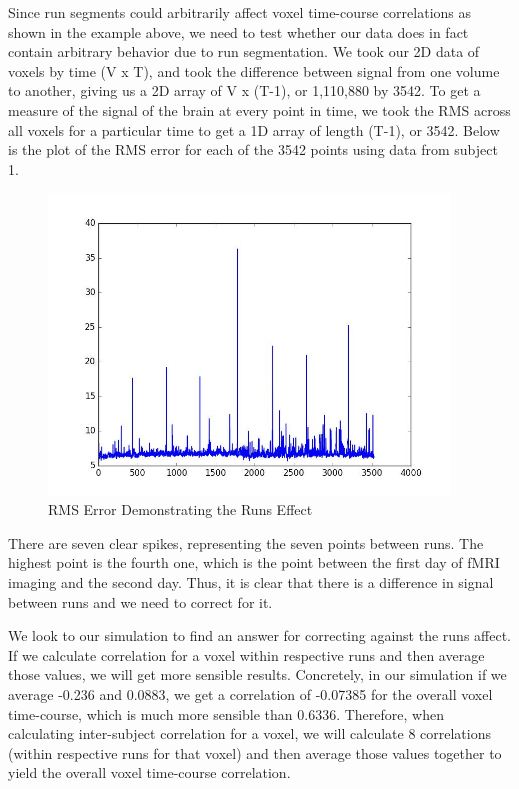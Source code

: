 \documentclass[11pt]{article}
\begin{document}
Since run segments could arbitrarily affect voxel time-course correlations as shown in the example above, we need to test whether our data does in fact contain arbitrary behavior due to run segmentation. We took our 2D data of voxels by  time (V x T), and took the 
difference between signal from one volume to another, giving us a 2D array of 
V x (T-1), or 1,110,880 by 3542. To get a measure of the signal of the brain at 
every point in time, we took the RMS across all voxels for a particular time to 
get a 1D array of length (T-1), or 3542. Below is the plot of the RMS error for each of the 3542 points using data from subject 1. 

\begin{figure}[H]                                                               
\caption{RMS Error Demonstrating the Runs Effect}   
\centering                                                                      
\includegraphics[height=8cm]{runs_effect.jpg}                            
\end{figure}  

There are seven clear spikes, 
representing the seven points between runs.  The highest point is the fourth 
one, which is the point between the first day of fMRI imaging and the second
day.  Thus, it is clear that there is a difference in signal between runs and
we need to correct for it.  

We look to our simulation to find an answer for correcting against the runs affect. If we calculate correlation for a voxel within respective runs and then average those values, we will get more sensible results. Concretely, in our simulation if we average -0.236 and 0.0883, we get a correlation of -0.07385 for the overall voxel time-course, which is much more sensible than 0.6336. Therefore, when calculating inter-subject correlation for a voxel, we will calculate 8 correlations (within respective runs for that voxel) and then average those values together to yield the overall voxel time-course correlation.
\end{document}
